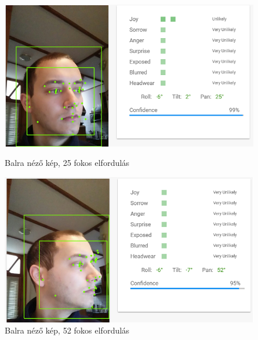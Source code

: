 \begin{figure}[h]
 \begin{minipage}{.5\textwidth} 
    \includegraphics[scale=0.3]{img/cloud_vision_left}
    \caption{Balra néző kép, 25 fokos elfordulás}
 \end{minipage}
 \begin{minipage}{.5\textwidth} 
     \includegraphics[scale=0.3]{img/cloud_vision_very_left}
     \caption{Balra néző kép, 52 fokos elfordulás}
 \end{minipage}
\end{figure}

